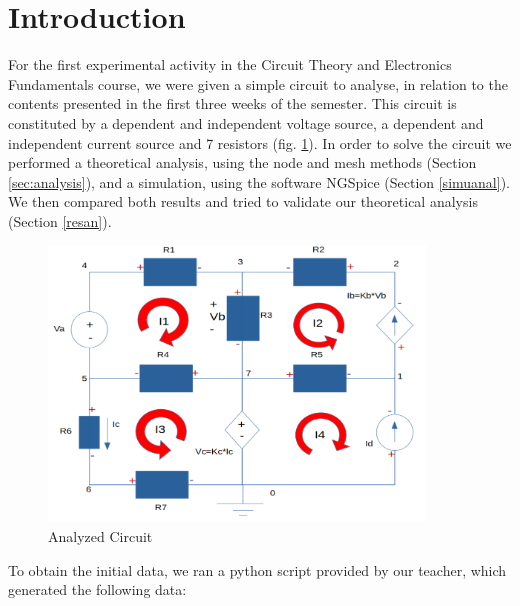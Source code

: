 \documentclass[11en, a4paper, oneside]{article}
\begin{document}
\newpage
\renewcommand{\contentsname}{Índice}
\tableofcontents
\thispagestyle{empty}

\newpage
{}
\setcounter{page}{3}

\section{Introduction}

For the first experimental activity in the Circuit Theory and Electronics Fundamentals course, we were given a simple circuit to analyse, in relation to the contents presented in the first three weeks of the semester.
This circuit is constituted by a dependent and independent voltage source, a dependent and independent current source and 7 resistors (fig. \ref{intro}).
In order to solve the circuit we performed a theoretical analysis, using the node and mesh methods (Section \ref{sec:analysis}), and a simulation, using the software NGSpice (Section \ref{simuanal}). We then compared both results and tried to validate our theoretical analysis (Section \ref{resan}).

\begin{figure}[htb!]
			\begin{center}
				\includegraphics[width=10cm]{Intro.png}
				\caption{Analyzed Circuit}
				\label{intro}
			\end{center}
\end{figure}

To obtain the initial data, we ran a python script provided by our teacher, which generated the following data:\\
\end{document}
